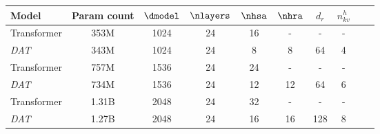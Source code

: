 \begin{tabular}{@{}lcc|cccccc|c@{}}
    \toprule
    Model        & Param count   &$\dmodel$&$\nlayers$& $\nhsa$  & $\nhra$ & $d_r$ & $n_{kv}^{h}$  \\ \midrule\hline
    Transformer  & 353M   & 1024    & 24       & 16       & -        & -     & -           \\
    \textit{DAT} & 343M   & 1024    & 24       & 8        & 8        & 64    & 4           \\\midrule
    Transformer  & 757M   & 1536    & 24       & 24       & -        & -     & -           \\
    \textit{DAT} & 734M   & 1536    & 24       & 12       & 12       & 64     & 6          \\\midrule
    Transformer  & 1.31B  & 2048    & 24       & 32       & -        & -     & -           \\
    \textit{DAT} & 1.27B  & 2048    & 24       & 16       & 16       & 128   & 8           \\\bottomrule
\end{tabular}%
